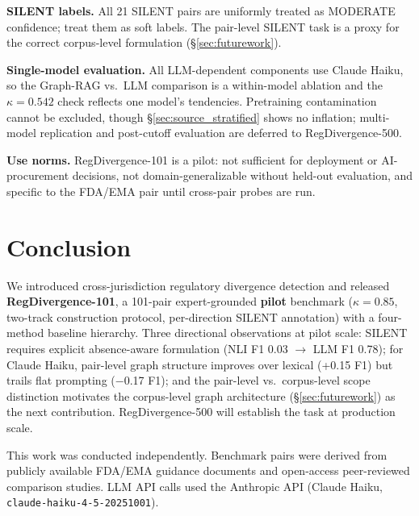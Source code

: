 \documentclass[manuscript]{acmart}
\begin{document}
\textbf{SILENT labels.} All 21 SILENT pairs are uniformly treated as MODERATE confidence;
treat them as soft labels. The pair-level SILENT task is a proxy for the correct
corpus-level formulation (\S\ref{sec:futurework}).

\textbf{Single-model evaluation.} All LLM-dependent components use Claude Haiku,
so the Graph-RAG vs.\ LLM comparison is a within-model ablation and the
$\kappa = 0.542$ check reflects one model's tendencies. Pretraining
contamination cannot be excluded, though \S\ref{sec:source_stratified} shows no
inflation; multi-model replication and post-cutoff evaluation are deferred to
RegDivergence-500.

\textbf{Use norms.} RegDivergence-101 is a pilot: not sufficient for deployment
or AI-procurement decisions, not domain-generalizable without held-out
evaluation, and specific to the FDA/EMA pair until cross-pair probes are run.

\section{Conclusion}

We introduced cross-jurisdiction regulatory divergence detection and released
\textbf{RegDivergence-101}, a 101-pair expert-grounded \textbf{pilot} benchmark
($\kappa = 0.85$, two-track construction protocol, per-direction SILENT
annotation) with a four-method baseline hierarchy. Three directional
observations at pilot scale: SILENT requires explicit absence-aware formulation
(NLI F1 0.03 $\to$ LLM F1 0.78); for Claude Haiku, pair-level graph structure
improves over lexical (+0.15 F1) but trails flat prompting ($-$0.17 F1); and
the pair-level vs.\ corpus-level scope distinction motivates the corpus-level
graph architecture (\S\ref{sec:futurework}) as the next contribution.
RegDivergence-500 will establish the task at production scale.

\begin{acks}
This work was conducted independently. Benchmark pairs were derived from
publicly available FDA/EMA guidance documents and open-access peer-reviewed
comparison studies. LLM API calls used the Anthropic API (Claude Haiku,
\texttt{claude-haiku-4-5-20251001}).
\end{acks}



\end{document}
